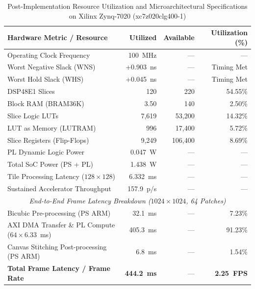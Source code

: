 \documentclass[conference]{IEEEtran}
\begin{document}
\begin{table}[!b]
\caption{Post-Implementation Resource Utilization and Microarchitectural Specifications on Xilinx Zynq-7020 (xc7z020clg400-1)}
\label{tab:accelerator_specs}
\centering
\begin{tabular}{lrrr}
\hline
\textbf{Hardware Metric / Resource} & \textbf{Utilized} & \textbf{Available} & \textbf{Utilization (\%)} \\
\hline
Operating Clock Frequency & 100~MHz & --- & --- \\
Worst Negative Slack (WNS) & +0.903~ns & --- & Timing Met \\
Worst Hold Slack (WHS) & +0.045~ns & --- & Timing Met \\
DSP48E1 Slices & 120 & 220 & 54.55\% \\
Block RAM (BRAM36K) & 3.50 & 140 & 2.50\% \\
Slice Logic LUTs & 7,619 & 53,200 & 14.32\% \\
LUT as Memory (LUTRAM) & 996 & 17,400 & 5.72\% \\
Slice Registers (Flip-Flops) & 9,249 & 106,400 & 8.69\% \\
PL Dynamic Logic Power & 0.047~W & --- & --- \\
Total SoC Power (PS + PL) & 1.438~W & --- & --- \\
Tile Processing Latency ($128 \times 128$) & 6.332~ms & --- & --- \\
Sustained Accelerator Throughput & 157.9~p/s & --- & --- \\
\hline
\multicolumn{4}{c}{\textit{End-to-End Frame Latency Breakdown ($1024 \times 1024$, 64 Patches)}} \\
\hline
Bicubic Pre-processing (PS ARM) & 32.1~ms & --- & 7.23\% \\
AXI DMA Transfer \& PL Compute ($64 \times 6.33$~ms) & 405.3~ms & --- & 91.23\% \\
Canvas Stitching Post-processing (PS ARM) & 6.8~ms & --- & 1.54\% \\
\textbf{Total Frame Latency / Frame Rate} & \textbf{444.2~ms} & --- & \textbf{2.25~FPS} \\
\hline
\end{tabular}
\end{table}



\end{document}
